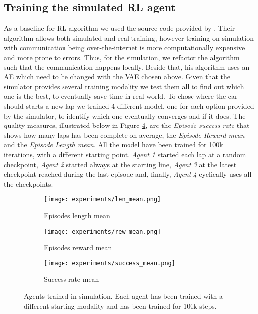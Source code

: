 \subsection{Training the simulated RL agent}
As a baseline for RL algorithm we used the source code provided by \citet{DBLP:journals/corr/abs-2008-00715}. Their algorithm allows both simulated and real training, however training on simulation with communication being over-the-internet is more computationally expensive and more prone to errors. Thus, for the simulation, we refactor the algorithm such that the communication happens locally. Beside that, his algorithm uses an AE which need to be changed with the VAE chosen above. Given that the simulator provides several training modality we test them all to find out which one is the best, to eventually save time in real world. To chose where the car should starts a new lap we trained 4 different model, one for each option provided by the simulator, to identify which one eventually converges and if it does. The quality measures, illustrated below in Figure \ref{fig:agentresults}, are the \textit{Episode success rate} that shows how many laps has been complete on average, the \textit{Episode Reward mean} and the \textit{Episode Length mean}. All the model have been trained for 100k iterations, with a different starting point.\textit{ Agent 1} started each lap at a random checkpoint,\textit{ Agent 2} started always at the starting line,\textit{ Agent 3} at the latest checkpoint reached during the last episode and, finally,\textit{ Agent 4} cyclically uses all the checkpoints.
\begin{figure}[h]
  \centering
  \begin{subfigure}{.5\linewidth}
      \centering
      \texttt{[image: experiments/len\_mean.png]}
      \caption{Episodes length mean}\label{fig:len}
  \end{subfigure}%
      \hfill
  \begin{subfigure}{.5\linewidth}
      \centering
      \texttt{[image: experiments/rew\_mean.png]}
      \caption{Episodes reward mean}\label{fig:rew}
  \end{subfigure}
  
  \bigskip
  \begin{subfigure}{.5\linewidth}
    \centering
    \texttt{[image: experiments/success\_mean.png]}
    \caption{Success rate mean}\label{fig:succ}
  \end{subfigure} 
  \caption{Agents trained in simulation. Each agent has been trained with a different starting modality and has been trained for 100k steps.}
  \label{fig:agentresults}
\end{figure}
